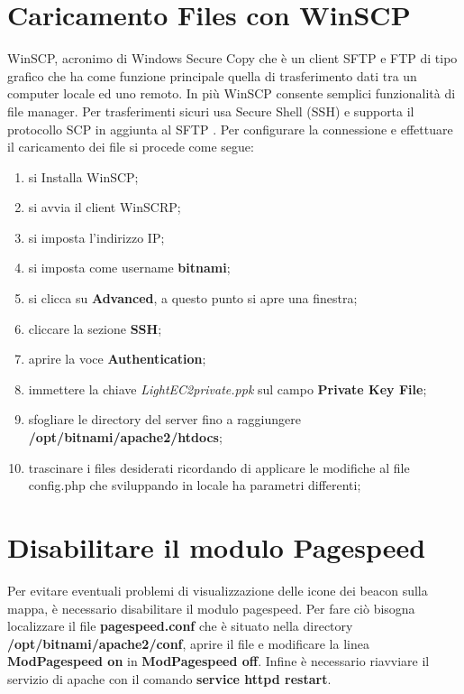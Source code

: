 \section{Caricamento Files con WinSCP}
WinSCP, acronimo di Windows Secure Copy che è un client SFTP e FTP di tipo grafico che ha come funzione principale quella di trasferimento dati tra un computer locale ed uno remoto. In più WinSCP consente semplici funzionalità di file manager. Per trasferimenti sicuri usa Secure Shell (SSH) e supporta il protocollo SCP in aggiunta al SFTP \cite{sito_winscp}.  \newline
Per configurare la connessione e effettuare il caricamento dei file si procede come segue:
\begin{enumerate}
\item si Installa WinSCP;
\item si avvia il client WinSCRP;
\item si imposta l'indirizzo IP;
\item si imposta come username \textbf{bitnami};
\item si clicca su \textbf{Advanced}, a questo punto si apre una finestra;
\item cliccare la sezione \textbf{SSH};
\item aprire la voce \textbf{Authentication};
\item immettere la chiave \textit{LightEC2private.ppk} sul campo \textbf{Private Key File};
\item sfogliare le directory del server fino a raggiungere \textbf{/opt/bitnami/apache2/htdocs};
\item trascinare i files desiderati ricordando di applicare le modifiche al file config.php che sviluppando in locale ha parametri differenti;
\end{enumerate}

\section{Disabilitare il modulo Pagespeed}
Per evitare eventuali problemi di visualizzazione delle icone dei beacon sulla mappa, è necessario disabilitare il modulo pagespeed.
Per fare ciò bisogna localizzare il file \textbf{pagespeed.conf} che è situato nella directory \textbf{/opt/bitnami/apache2/conf}, aprire il file e modificare la linea \textbf{ModPagespeed on} in \textbf{ModPagespeed off}. 
Infine è necessario riavviare il servizio di apache con il comando \textbf{service httpd restart}.


\newpage

